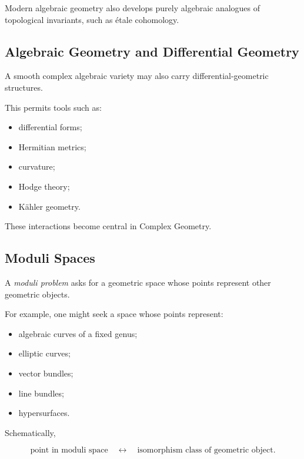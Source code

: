 Modern algebraic geometry also develops purely algebraic analogues of
topological invariants, such as \'etale cohomology.

\subsection{Algebraic Geometry and Differential Geometry}
\label{subsec:algebraic-differential-geometry}

A smooth complex algebraic variety may also carry differential-geometric
structures.

This permits tools such as:

\begin{itemize}
    \item differential forms;
    \item Hermitian metrics;
    \item curvature;
    \item Hodge theory;
    \item K\"ahler geometry.
\end{itemize}

These interactions become central in Complex Geometry.

\subsection{Moduli Spaces}
\label{subsec:moduli-spaces-preview}

A \emph{moduli problem} asks for a geometric space whose points represent
other geometric objects.

For example, one might seek a space whose points represent:

\begin{itemize}
    \item algebraic curves of a fixed genus;
    \item elliptic curves;
    \item vector bundles;
    \item line bundles;
    \item hypersurfaces.
\end{itemize}

Schematically,

\[
\boxed{
\text{point in moduli space}
\quad\longleftrightarrow\quad
\text{isomorphism class of geometric object}.
}
\]

